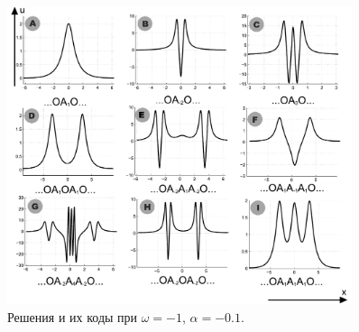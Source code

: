 \documentclass{beamer}
\begin{document}
\begin{frame}	
	\begin{figure}
		\includegraphics[width=0.9\textwidth]{pic/classification.pdf}
		\caption{Решения и их коды при $\omega = -1$, $\alpha = -0.1$.}
		\label{pic:classification}
	\end{figure}
\end{frame}
\end{document}
